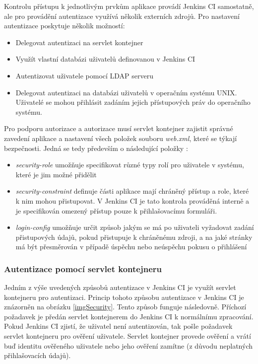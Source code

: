             Kontrolu přístupu k jednotlivým prvkům aplikace provádí 
            Jenkins CI samostatně, ale pro provádění autentizace využívá několik externích zdrojů. Pro nastavení autentizace
            poskytuje několik možností:

            \begin{itemize}
                \item Delegovat autentizaci na servlet kontejner
                \item Využít vlastní databázi uživatelů definovanou v Jenkins CI
                \item Autentizovat uživatele pomocí LDAP serveru
                \item Delegovat autentizaci na databázi uživatelů v operačním systému UNIX. Uživatelé 
                    se mohou přihlásit zadáním jejich přístupových práv do operačního systému. 
            \end{itemize}
            
            Pro podporu autorizace a autorizace musí servlet kontejner zajistit správné zavedení aplikace a nastavení
            všech položek souboru \emph{web.xml}, které se týkají bezpečnosti. Jedná se tedy především
            o následující položky \cite{webXml}:

            \begin{itemize}
                \item \emph{security-role} umožňuje specifikovat různé typy rolí pro uživatele v systému,
                    které je jim možné přidělit
                \item \emph{security-constraint} definuje části aplikace mají chráněný přístup a role, které k nim
                    mohou přistupovat. V Jenkins CI je tato kontrola prováděná interně a je specifikován
                    omezený přístup pouze k přihlašovacímu formuláři.
                \item \emph{login-config} umožňuje určit způsob jakým se má po uživateli vyžadovat zadání přistupových
                    údajů, pokud přistupuje k chráněnému zdroji, a na jaké stránky má být přesměrován v případě úspěchu
                    nebo neúspěchu pokusu o přihlášení
            \end{itemize}
            
    
            \subsubsection{Autentizace pomocí servlet kontejneru}
                Jedním z výše uvedených způsobů autentizace v Jenkins CI je využít servlet kontejneru pro autentizaci.
                Princip tohoto způsobu autentizace v Jenkins CI je znázorněn na obrázku \ref{imgSecurity}. 
                Tento způsob funguje následovně. Příchozí 
                požadavek je předán servlet kontejnerem do Jenkins CI k normálnímu zpracování. 
                Pokud Jenkins CI zjistí, že uživatel
                není autentizován, tak pošle požadavek servlet kontejneru pro ověření uživatele. Servlet
                kontejner provede ověření a vrátí buď identitu ověřeného uživatele nebo jeho ověření zamítne (z důvodu
                neplatných přihlašovacích údajů).
                
